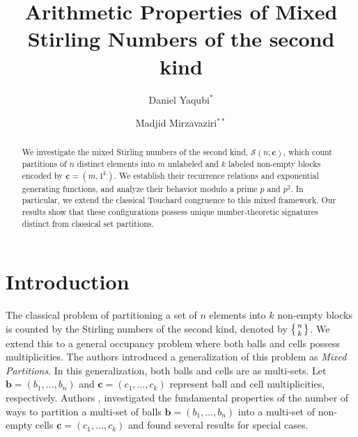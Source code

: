 \documentclass[12pt]{amsart}
\title{Arithmetic Properties of Mixed Stirling Numbers of the second kind}
\author{Daniel Yaqubi$^{*}$}
\author{Madjid Mirzavaziri$^{**}$}
\theoremstyle{definition}
\begin{document}
\begin{abstract}
We investigate the mixed Stirling numbers of the second kind, $\mathcal{S}(n; \mathbf{c})$, which count partitions of $n$ distinct elements into $m$ unlabeled and $k$ labeled non-empty blocks encoded by $\mathbf{c} = (m, 1^k)$. We establish their recurrence relations and exponential generating functions, and analyze their behavior modulo a prime $p$ and $p^2$. In particular, we extend the classical Touchard congruence to this mixed framework. Our results show that these configurations possess unique number-theoretic signatures distinct from classical set partitions.
\end{abstract}
\maketitle
\section{Introduction}

The classical problem of partitioning a set of $n$ elements into $k$ non-empty blocks is counted by the Stirling numbers of the second kind, denoted by $\left\{ \genfrac{}{}{0pt}{}{n}{k} \right\}$. We extend this to a general occupancy problem where both balls and cells possess multiplicities. The authors \cite{Yaqubi2016, Yaqubi2019, Yaqubi2020} introduced a generalization of this problem as \textit{Mixed Partitions}. In this generalization, both balls and cells are as multi-sets. Let $\mathbf{b}=(b_1, \dots, b_n)$ and $\mathbf{c}=(c_1, \dots, c_k)$ represent ball and cell multiplicities, respectively. Authors \cite{Yaqubi2016}, investigated the fundamental properties of the number of ways to partition a multi-set of balls $\mathbf{b}=(b_1, \dots, b_n)$ into a multi-set of non-empty cells $\mathbf{c}=(c_1, \dots, c_k)$ and found several results for special cases.
\end{document}
